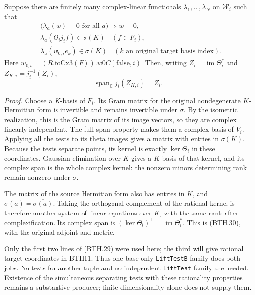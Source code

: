 Suppose there are finitely many complex-linear functionals
\(\lambda_1,\ldots,\lambda_N\) on \(\mathcal W_i\) such that
\[
 \begin{split}
  &\bigl(\lambda_a(w)=0\text{ for all }a\bigr)\Longrightarrow w=0,\\
  &\lambda_a(\Theta_i j_i f)\in\sigma(K)
                   \quad(f\in F_i),\\
  &\lambda_a(w_{0,i}e_k)\in\sigma(K)
                   \quad(k\text{ an original target basis index}).
 \end{split}                                                    \tag{BTH.29}
\]
Here \(w_{0,i}=(R.\mathrm{toCx3}(F)).w0C(\mathrm{false},i)\).
Then, writing
\(Z_i=\operatorname{im}\Theta_i^*\) and
\(Z_{K,i}=j_i^{-1}(Z_i)\),
\[
                   \operatorname{span}_{\mathbb C}j_i(Z_{K,i})
                         =Z_i.                                 \tag{BTH.30}
\]

\emph{Proof.}
Choose a \(K\)-basis of \(F_i\).  Its Gram matrix for the
original nondegenerate \(K\)-Hermitian form is invertible
and remains invertible under \(\sigma\).  By the isometric
realization, this is the Gram matrix of its image vectors,
so they are complex linearly independent.  The full-span
property makes them a complex basis of \(V_i\).
Applying all the tests to its
theta images gives a matrix with entries in \(\sigma(K)\).
Because the tests separate points, its kernel is exactly
\(\ker\Theta_i\) in these coordinates.  Gaussian elimination
over \(K\) gives a \(K\)-basis of that kernel, and its
complex span is the whole complex kernel: the nonzero
minors determining rank remain nonzero under \(\sigma\).

The matrix of the source Hermitian form also has entries
in \(K\), and \(\sigma(\bar a)=\overline{\sigma(a)}\).
Taking the orthogonal complement of the rational kernel
is therefore another system of linear equations over
\(K\), with the same rank after complexification.
Its complex span is
\((\ker\Theta_i)^\perp=\operatorname{im}\Theta_i^*\).
This is (BTH.30), with the original adjoint and metric.

Only the first two lines of (BTH.29) were used here;
the third will give rational target coordinates in
BTH11.  Thus one base-only \texttt{Lift\allowbreak Test\allowbreak B} family
does both jobs.  No tests for another tuple and no
independent \texttt{Lift\allowbreak Test} family are needed.
Existence of the simultaneous separating tests with
these rationality properties remains a substantive
producer; finite-dimensionality alone does not supply
them.

